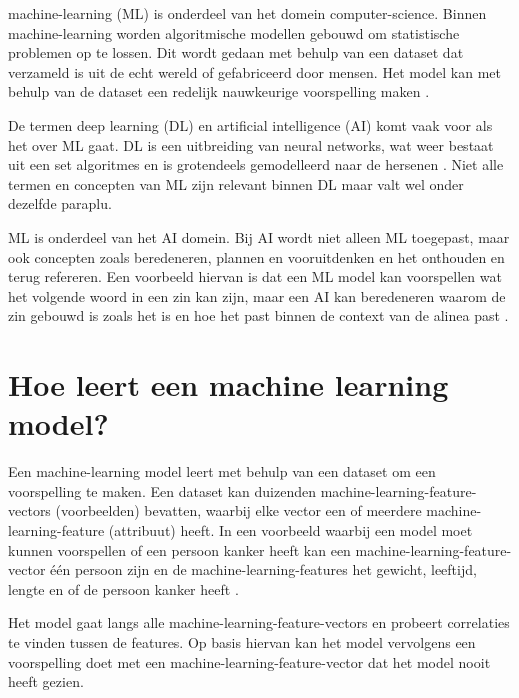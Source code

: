 
\Gls{machine-learning} (ML) is onderdeel van het domein \gls{computer-science}. Binnen \gls{machine-learning} worden algoritmische modellen gebouwd om statistische problemen op te lossen. Dit wordt gedaan met behulp van een dataset dat verzameld is uit de echt wereld of gefabriceerd door mensen. Het model kan met behulp van de dataset een redelijk nauwkeurige voorspelling maken \cite[p.~7]{the-hundred-page-machine-learning-book}.

De termen deep learning (DL) en artificial intelligence (AI) komt vaak voor als het over ML gaat. DL is een uitbreiding van neural networks, wat weer bestaat uit een set algoritmes en is grotendeels gemodelleerd naar de hersenen \cite{ml-neural-network-nicholson}. Niet alle termen en concepten van ML zijn relevant binnen DL maar valt wel onder dezelfde paraplu.

ML is onderdeel van het AI domein. Bij AI wordt niet alleen ML toegepast, maar ook concepten zoals beredeneren, plannen en vooruitdenken en het onthouden en terug refereren. Een voorbeeld hiervan is dat een ML model kan voorspellen wat het volgende woord in een zin kan zijn, maar een AI kan beredeneren waarom de zin gebouwd is zoals het is en hoe het past binnen de context van de alinea past \cite{ml-think-about-ml-brownlee}.

\section{Hoe leert een machine learning model?}\label{sec:hoe-leert-een-machine-learning-model}
Een \gls{machine-learning} model leert met behulp van een dataset om een voorspelling te maken. Een dataset kan duizenden \glspl{machine-learning-feature-vector} (voorbeelden) bevatten, waarbij elke vector een of meerdere \gls{machine-learning-feature} (attribuut) heeft. In een voorbeeld waarbij een model moet kunnen voorspellen of een persoon kanker heeft kan een \gls{machine-learning-feature-vector} één persoon zijn en de \glspl{machine-learning-feature} het gewicht, leeftijd, lengte en of de persoon kanker heeft \cite{google-ml-terminology}.

Het model gaat langs alle \glspl{machine-learning-feature-vector} en probeert correlaties te vinden tussen de features. Op basis hiervan kan het model vervolgens een voorspelling doet met een \gls{machine-learning-feature-vector} dat het model nooit heeft gezien.

